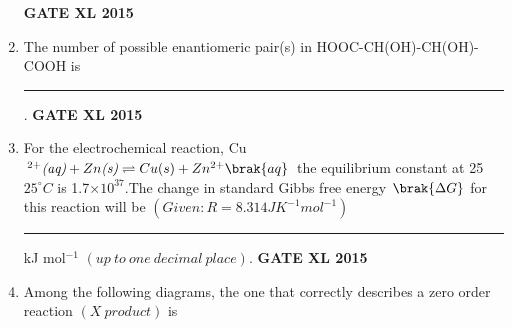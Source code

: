 \documentclass[journal,12pt,onecolumn]{IEEEtran}
\begin{document}
\begin{enumerate}
\begin{enumerate}
    \end{enumerate}
\hfill{\textbf{GATE XL 2015}}
\item The number of possible enantiomeric pair(s) in HOOC-CH(OH)-CH(OH)-COOH is \rule{1cm}{0.15mm}.
\hfill{\textbf{GATE XL 2015}}
\item For the electrochemical reaction, Cu$^{2+}\textit{(aq)}+Zn\textit{(s)} \rightleftharpoons Cu(s) +Zn^{2+} \brak{aq}$ the equilibrium constant at 25 $25^{\circ} C$ is 1.7$\times 10 ^{37}$.The change in standard Gibbs free energy $\brak{\Delta G}$ for this reaction will be $(Given: R = 8.314JK ^ {- 1} mol ^{- 1} )$\rule{1cm}{0.15mm} kJ mol$^{-1}$ $(up \ to \ one \ decimal \ place)$.
\hfill{\textbf{GATE XL 2015}}
\item Among the following diagrams, the one that correctly describes a zero order reaction $(X \ product)$ is


\end{enumerate}
\end{document}
